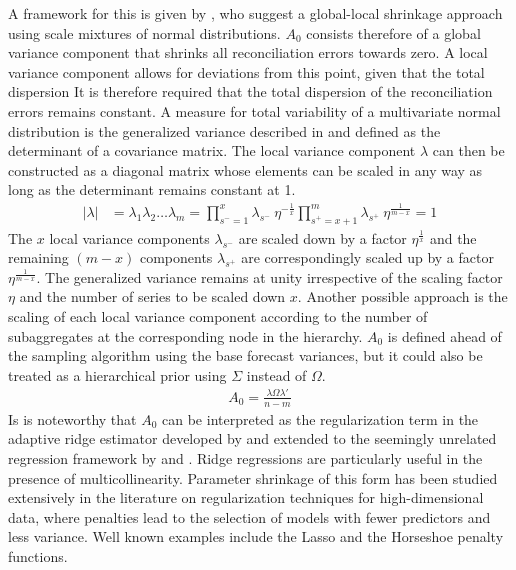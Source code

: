 \documentclass[a4paper,fleqn,11pt]{article}
\begin{document}
A framework for this is given by \cite{Polson2010}, who suggest a global-local shrinkage approach using scale mixtures of normal distributions. $A_0$ consists therefore of a global variance component that shrinks all reconciliation errors towards zero. A local variance component allows for deviations from this point, given that the total dispersion It is therefore required that the total dispersion of the reconciliation errors remains constant.  A measure for total variability of a multivariate normal distribution is the generalized variance described in \cite{Mustonen1997} and defined as the determinant of a covariance matrix. The local variance component $\lambda$ can then be constructed as a diagonal matrix whose elements can be scaled in any way as long as the determinant remains constant at 1.
\begin{align*}
|\lambda| &= \lambda_1 \lambda_2 \hdots \lambda_m
   	= \prod_{s^- = 1}^{x} \lambda_{s^-}\ \eta^{-\frac{1}{x}}   \prod_{s^+ = x+1}^{m} \lambda_{s^+}\ \eta^{\frac{1}{m-x}} = 1
\end{align*}
The $x$ local variance components $\lambda_{s^-}$ are scaled down by a factor $\eta^{\frac{1}{x}}$ and the remaining $(m-x)$ components $\lambda_{s^+}$ are correspondingly scaled up by a factor $\eta^{\frac{1}{m-x}}$. The generalized variance remains at unity irrespective of the scaling factor $\eta$ and the number of series to be scaled down $x$. Another possible approach is the scaling of each local variance component according to the number of subaggregates at the corresponding node in the hierarchy. $A_0$ is defined ahead of the sampling algorithm using the base forecast variances, but it could also be treated as a hierarchical prior using $\Sigma$ instead of $\Omega$.
\begin{align}
    	A_0 =  \frac{\lambda\Omega \lambda'}{n-m}
\end{align}
Is is noteworthy that $A_0$ can be interpreted as the regularization term in the adaptive ridge estimator developed by \cite{Brown1980} and extended to the seemingly unrelated regression framework by \cite{Haitovsky1987} and \cite{Firinguetti1997}. Ridge regressions are particularly useful in the presence of multicollinearity. Parameter shrinkage of this form has been studied extensively in the literature on regularization techniques for high-dimensional data, where penalties lead to the selection of models with fewer predictors and less variance. Well known examples include the Lasso and the Horseshoe penalty functions.\\
\clearpage
\end{document}
